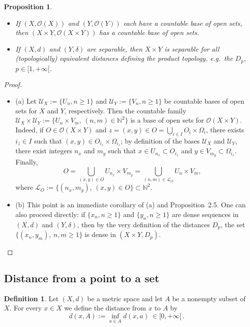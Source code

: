 \documentclass[11pt]{article}
\newtheorem{proposition}{Proposition}[section]
\theoremstyle{definition}
\newtheorem{definition}{Definition}[section]
\begin{document}
\begin{proposition}
\begin{itemize}[leftmargin=1.5em]
\item[(a)] If $(X,\mathcal{O}(X))$ and $(Y,\mathcal{O}(Y))$ each have a countable base of open sets, then $(X\times Y,\mathcal{O}(X\times Y))$ has a countable base of open sets.
\item[(b)] If $(X,d)$ and $(Y,\delta)$ are separable, then $X\times Y$ is separable for all (topologically) equivalent distances defining the product topology, e.g.\ the $D_p$, $p\in[1,+\infty[$.
\end{itemize}
\end{proposition}

\begin{proof}
\begin{itemize}
\item (a) Let $\mathcal{U}_X:=\{U_n, n\ge 1\}$ and $\mathcal{U}_Y:=\{V_n, n\ge 1\}$ be countable bases of open sets for $X$ and $Y$, respectively.
Then the countable family $\mathcal{U}_X\times\mathcal{U}_Y:=\{U_n\times V_m,\ (n,m)\in\mathbb{N}^2\}$ is a base of open sets for $\mathcal{O}(X\times Y)$.
Indeed, if $O\in\mathcal{O}(X\times Y)$ and $z=(x,y)\in O=\bigcup_{i\in I} O_i\times\Omega_i$, there exists $i_z\in I$ such that $(x,y)\in O_{i_z}\times\Omega_{i_z}$; by definition of the bases $\mathcal{U}_X$ and $\mathcal{U}_Y$, there exist integers $n_x$ and $m_y$ such that $x\in U_{n_x}\subset O_{i_z}$ and $y\in V_{m_y}\subset \Omega_{i_z}$.
Finally,
\[
O=\bigcup_{(x,y)\in O} U_{n_x}\times V_{m_y}=\bigcup_{(n,m)\in\mathcal{L}_O} U_n\times V_m,
\]
where $\mathcal{L}_O:=\{(n_x,m_y),\ (x,y)\in O\}\subset\mathbb{N}^2$.

\item (b) This point is an immediate corollary of (a) and Proposition~2.5.
One can also proceed directly: if $\{x_n, n\ge 1\}$ and $\{y_n, n\ge 1\}$ are dense sequences in $(X,d)$ and $(Y,\delta)$, then by the very definition of the distances $D_p$, the set $\{(x_n,y_m),\ n,m\ge 1\}$ is dense in $(X\times Y, D_p)$.
\end{itemize}
\end{proof}

\subsection{Distance from a point to a set}

\begin{definition}
Let $(X,d)$ be a metric space and let $A$ be a nonempty subset of $X$.
For every $x\in X$ we define the distance from $x$ to $A$ by
\[
d(x,A):=\inf_{a\in A} d(x,a)\ \in [0,+\infty[\, .
\]
\end{definition}
\end{document}
